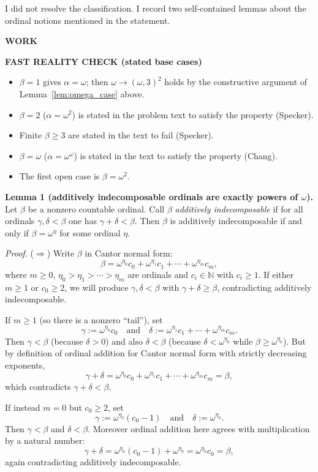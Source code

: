 I did not resolve the classification. I record two self-contained lemmas about the ordinal notions mentioned in the statement.

\bigskip
\noindent\textbf{WORK}

\medskip
\noindent\textbf{FAST REALITY CHECK (stated base cases)}

\begin{itemize}
\item $\beta=1$ gives $\alpha=\omega$; then $\omega\to(\omega,3)^2$ holds by the constructive argument of Lemma~\ref{lem:omega_case} above.
\item $\beta=2$ ($\alpha=\omega^2$) is stated in the problem text to satisfy the property (Specker).
\item Finite $\beta\ge 3$ are stated in the text to fail (Specker).
\item $\beta=\omega$ ($\alpha=\omega^\omega$) is stated in the text to satisfy the property (Chang).
\item The first open case is $\beta=\omega^2$.
\end{itemize}

\medskip
\noindent\textbf{Lemma 1 (additively indecomposable ordinals are exactly powers of $\omega$).}\label{lem:add_indec}
Let $\beta$ be a nonzero countable ordinal.
Call $\beta$ \emph{additively indecomposable} if for all ordinals $\gamma,\delta<\beta$ one has $\gamma+\delta<\beta$.
Then $\beta$ is additively indecomposable if and only if $\beta=\omega^\eta$ for some ordinal $\eta$.

\emph{Proof.}
($\Rightarrow$)
Write $\beta$ in Cantor normal form:
\[
\beta=\omega^{\eta_0}c_0+\omega^{\eta_1}c_1+\cdots+\omega^{\eta_m}c_m,
\]
where $m\ge 0$, $\eta_0>\eta_1>\cdots>\eta_m$ are ordinals and $c_i\in\mathbb{N}$ with $c_i\ge 1$.
If either $m\ge 1$ or $c_0\ge 2$, we will produce $\gamma,\delta<\beta$ with $\gamma+\delta\ge\beta$, contradicting additively indecomposable.

If $m\ge 1$ (so there is a nonzero ``tail''), set
\[
\gamma:=\omega^{\eta_0}c_0 \quad\text{and}\quad \delta:=\omega^{\eta_1}c_1+\cdots+\omega^{\eta_m}c_m.
\]
Then $\gamma<\beta$ (because $\delta>0$) and also $\delta<\beta$ (because $\delta<\omega^{\eta_0}$ while $\beta\ge\omega^{\eta_0}$).
But by definition of ordinal addition for Cantor normal form with strictly decreasing exponents,
\[
\gamma+\delta=\omega^{\eta_0}c_0+\omega^{\eta_1}c_1+\cdots+\omega^{\eta_m}c_m=\beta,
\]
which contradicts $\gamma+\delta<\beta$.

If instead $m=0$ but $c_0\ge 2$, set
\[
\gamma:=\omega^{\eta_0}(c_0-1)\quad\text{and}\quad\delta:=\omega^{\eta_0}.
\]
Then $\gamma<\beta$ and $\delta<\beta$.
Moreover ordinal addition here agrees with multiplication by a natural number:
\[
\gamma+\delta=\omega^{\eta_0}(c_0-1)+\omega^{\eta_0}=\omega^{\eta_0}c_0=\beta,
\]
again contradicting additively indecomposable.

